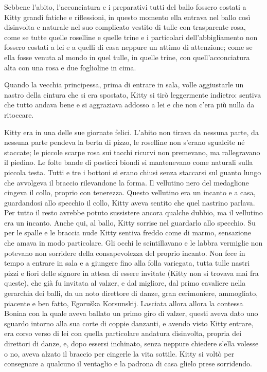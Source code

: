 Sebbene l'abito, l'acconciatura e i preparativi tutti del ballo fossero costati a Kitty grandi fatiche e riflessioni, in questo momento ella entrava nel ballo così disinvolta e naturale nel suo complicato vestito di tulle con trasparente rosa, come se tutte quelle roselline e quelle trine e i particolari dell'abbigliamento non fossero costati a lei e a quelli di casa neppure un attimo di attenzione; come se ella fosse venuta al mondo in quel tulle, in quelle trine, con quell'acconciatura alta con una rosa e due foglioline in cima. 

Quando la vecchia principessa, prima di entrare in sala, volle aggiustarle un nastro della cintura che si era spostato, Kitty si tirò leggermente indietro: sentiva che tutto andava bene e si aggraziava addosso a lei e che non c'era più nulla da ritoccare. 

Kitty era in una delle sue giornate felici. L'abito non tirava da nessuna parte, da nessuna parte pendeva la berta di pizzo, le roselline non s'erano sgualcite né staccate; le piccole scarpe rosa sui tacchi ricurvi non premevano, ma rallegravano il piedino. Le folte bande di posticci biondi si mantenevano come naturali sulla piccola testa. Tutti e tre i bottoni si erano chiusi senza staccarsi sul guanto lungo che avvolgeva il braccio rilevandone la forma. Il vellutino nero del medaglione cingeva il collo, proprio con tenerezza. Questo vellutino era un incanto e a casa, guardandosi allo specchio il collo, Kitty aveva sentito che quel nastrino parlava. Per tutto il resto avrebbe potuto sussistere ancora qualche dubbio, ma il vellutino era un incanto. Anche qui, al ballo, Kitty sorrise nel guardarlo allo specchio. Su per le spalle e le braccia nude Kitty sentiva freddo come di marmo, sensazione che amava in modo particolare. Gli occhi le scintillavano e le labbra vermiglie non potevano non sorridere della consapevolezza del proprio incanto. Non fece in tempo a entrare in sala e a giungere fino alla folla variegata, tutta tulle nastri pizzi e fiori delle signore in attesa di essere invitate (Kitty non si trovava mai fra queste), che già fu invitata al valzer, e dal migliore, dal primo cavaliere nella gerarchia dei balli, da un noto direttore di danze, gran cerimoniere, ammogliato, piacente e ben fatto, Egoruška Korsunskij. Lasciata allora allora la contessa Bonina con la quale aveva ballato un primo giro di valzer, questi aveva dato uno sguardo intorno alla sua corte di coppie danzanti, e avendo visto Kitty entrare, era corso verso di lei con quella particolare andatura disinvolta, propria dei direttori di danze, e, dopo essersi inchinato, senza neppure chiedere s'ella volesse o no, aveva alzato il braccio per cingerle la vita sottile. Kitty si voltò per consegnare a qualcuno il ventaglio e la padrona di casa glielo prese sorridendo. 

